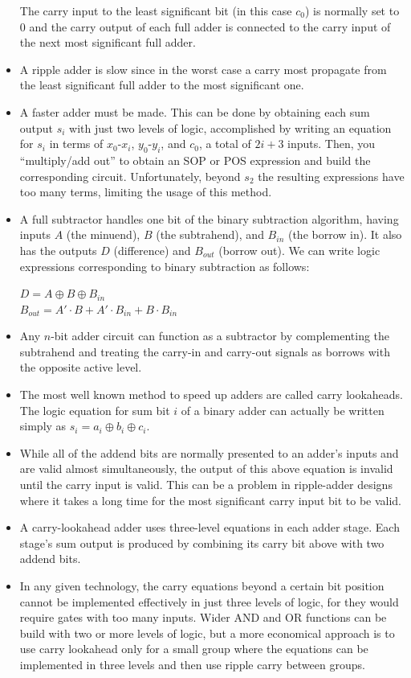 \documentclass[10pt,a4paper]{article}
\begin{document}
\begin{itemize}
The carry input to the least significant bit (in this case $c_0$) is normally set to 0 and the carry output of each full adder is connected to the carry input of the next most significant full adder. 
\item A ripple adder is slow since in the worst case a carry most propagate from the least significant full adder to the most significant one. 
\item A faster adder must be made. This can be done by obtaining each sum output $s_i$ with just two levels of logic, accomplished by writing an equation for $s_i$ in terms of $x_0$-$x_i$, $y_0$-$y_i$, and $c_0$, a total of $2i+3$ inputs. Then, you ``multiply/add out'' to obtain an SOP or POS expression and build the corresponding circuit. Unfortunately, beyond $s_2$ the resulting expressions have too many terms, limiting the usage of this method.
\item A full subtractor handles one bit of the binary subtraction algorithm, having inputs $A$ (the minuend), $B$ (the subtrahend), and $B_{in}$ (the borrow in). It also has the outputs $D$ (difference) and $B_{out}$ (borrow out). We can write logic expressions corresponding to binary subtraction as follows:
\begin{displayquote}
$D=A\oplus B\oplus B_{in}$\\
$B_{out}=A'\cdot B+A'\cdot B_{in}+B\cdot B_{in}$
\end{displayquote}
\item Any $n$-bit adder circuit can function as a subtractor by complementing the subtrahend and treating the carry-in and carry-out signals as borrows with the opposite active level. 
\item The most well known method to speed up adders are called carry lookaheads. The logic equation for sum bit $i$ of a binary adder can actually be written simply as $s_i=a_i\oplus b_i\oplus c_i$.
\item While all of the addend bits are normally presented to an adder's inputs and are valid almost simultaneously, the output of this above equation is invalid until the carry input is valid. This can be a problem in ripple-adder designs where it takes a long time for the most significant carry input bit to be valid. 
\item A carry-lookahead adder uses three-level equations in each adder stage. Each stage's sum output is produced by combining its carry bit above with two addend bits.
\item In any given technology, the carry equations beyond a certain bit position cannot be implemented effectively in just three levels of logic, for they would require gates with too many inputs. Wider AND and OR functions can be build with two or more levels of logic, but a more economical approach is to use carry lookahead only for a small group where the equations can be implemented in three levels and then use ripple carry between groups. 

\end{itemize}
\end{document}
